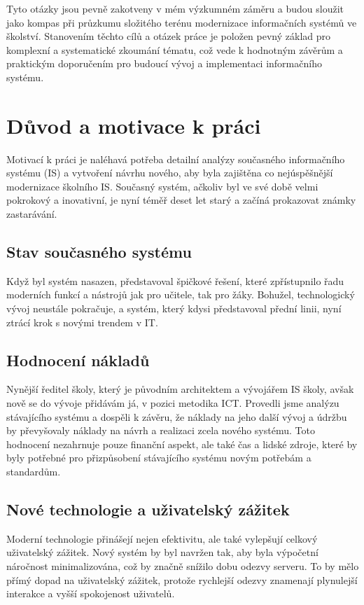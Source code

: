 \documentclass[FM,Proj]{tulthesis}
\begin{document}
Tyto otázky jsou pevně zakotveny v mém výzkumném záměru a budou sloužit jako kompas 
při průzkumu složitého terénu modernizace informačních systémů ve školství.
Stanovením těchto cílů a otázek práce je položen pevný základ pro komplexní a 
systematické zkoumání tématu, což vede k hodnotným závěrům a praktickým 
doporučením pro budoucí vývoj a implementaci informačního systému.

\section{Důvod a motivace k práci}
Motivací k práci je naléhavá potřeba detailní analýzy současného informačního 
systému (IS) a vytvoření návrhu nového, aby byla zajištěna co nejúspěšnější 
modernizace školního IS. Současný systém, ačkoliv byl ve své době velmi pokrokový 
a inovativní, je nyní téměř deset let starý a začíná prokazovat známky zastarávání.

\subsection*{Stav současného systému}
Když byl systém nasazen, představoval špičkové řešení, které zpřístupnilo řadu 
moderních funkcí a nástrojů jak pro učitele, tak pro žáky. Bohužel, 
technologický vývoj neustále pokračuje, a systém, který kdysi představoval 
přední linii, nyní ztrácí krok s novými trendem v IT.

\subsection*{Hodnocení nákladů}
Nynější ředitel školy, který je původním architektem a vývojářem IS školy, avšak nově
se do vývoje přidávám já, v pozici metodika ICT. Provedli jsme analýzu stávajícího systému
a dospěli k závěru, že náklady na jeho další vývoj a údržbu by převyšovaly náklady na 
návrh a realizaci zcela nového systému. Toto hodnocení nezahrnuje pouze finanční aspekt,
ale také čas a lidské zdroje, které by byly potřebné pro přizpůsobení stávajícího systému
 novým potřebám a standardům.

\subsection*{Nové technologie a uživatelský zážitek}
Moderní technologie přinášejí nejen efektivitu, ale také vylepšují celkový uživatelský zážitek.
Nový systém by byl navržen tak, aby byla výpočetní náročnost minimalizována, což by značně 
snížilo dobu odezvy serveru. To by mělo přímý dopad na uživatelský zážitek, protože 
rychlejší odezvy znamenají plynulejší interakce a vyšší spokojenost uživatelů.
\end{document}
